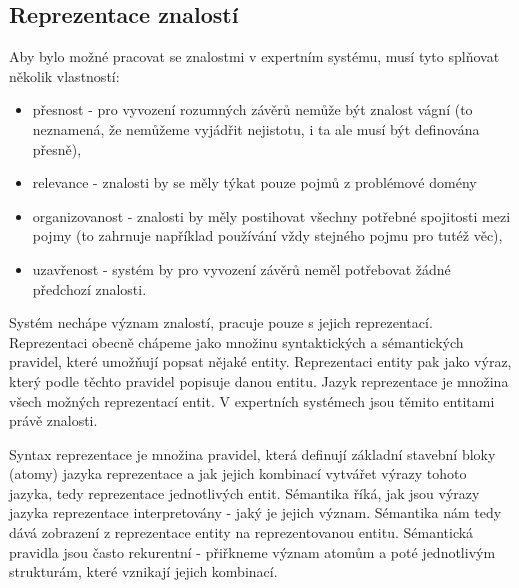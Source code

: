 \subsection{Reprezentace znalostí}
\label{knowledge representation}


Aby bylo možné pracovat se znalostmi v expertním systému, musí tyto splňovat
několik vlastností:
\begin{itemize}
  \item přesnost - pro vyvození rozumných závěrů nemůže být znalost vágní (to
    neznamená, že nemůžeme vyjádřit nejistotu, i ta ale musí být definována
    přesně),
  \item relevance - znalosti by se měly týkat pouze pojmů z problémové domény
  \item organizovanost - znalosti by měly postihovat všechny potřebné spojitosti
    mezi pojmy (to zahrnuje například používání vždy stejného pojmu pro tutéž
    věc),
  \item uzavřenost - systém by pro vyvození závěrů neměl potřebovat žádné
    předchozí znalosti.
\end{itemize}

Systém nechápe význam znalostí, pracuje pouze s jejich reprezentací.
Reprezentaci obecně chápeme jako množinu syntaktických a sémantických pravidel,
které umožňují popsat nějaké entity. Reprezentaci entity pak jako výraz, který
podle těchto pravidel popisuje danou entitu. Jazyk reprezentace je množina
všech možných reprezentací entit. V expertních systémech jsou těmito entitami
právě znalosti.

Syntax reprezentace je množina pravidel, která definují základní stavební bloky
(atomy) jazyka reprezentace a jak jejich kombinací vytvářet výrazy tohoto
jazyka, tedy reprezentace jednotlivých entit. Sémantika říká, jak jsou výrazy
jazyka reprezentace interpretovány - jaký je jejich význam. Sémantika nám tedy
dává zobrazení z reprezentace entity na reprezentovanou entitu. Sémantická
pravidla jsou často rekurentní - přiřkneme význam atomům a poté jednotlivým
strukturám, které vznikají jejich kombinací.

